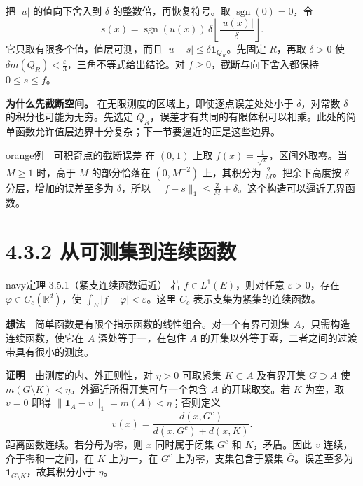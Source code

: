 \documentclass[11pt,a4paper]{article}
\begin{document}
把 \(|u|\) 的值向下舍入到 \(\delta\) 的整数倍，再恢复符号。取
\(\operatorname{sgn}(0)=0\)，令 \begin{equation*}
s(x)=\operatorname{sgn}(u(x))\,\delta
\left\lfloor\frac{|u(x)|}{\delta}\right\rfloor .
\end{equation*} 它只取有限多个值，值层可测，而且
\(|u-s|\le\delta\mathbf1_{Q_R}\)。先固定 \(R\)，再取 \(\delta>0\) 使
\(\delta m(Q_R)<\frac{\varepsilon}{3}\)，三角不等式给出结论。对
\(f\ge0\)，截断与向下舍入都保持 \(0\le s\le f\)。

\textbf{为什么先截断空间。} 在无限测度的区域上，即使逐点误差处处小于
\(\delta\)，对常数 \(\delta\) 的积分也可能为无穷。先选定
\(Q_R\)，误差才有共同的有限体积可以相乘。此处的简单函数允许值层边界十分复杂；下一节要逼近的正是这些边界。

\begin{sboxenv}{orange}{例　可积奇点的截断误差}
在 \((0,1)\) 上取 \(f(x)=\frac{1}{\sqrt{x}}\)，区间外取零。当 \(M\ge1\)
时，高于 \(M\) 的部分恰落在 \((0,M^{-2})\) 上，其积分为
\(\frac{2}{M}\)。把余下高度按 \(\delta\) 分层，增加的误差至多为
\(\delta\)，所以
\(\|f-s\|_1\le \frac{2}{M}+\delta\)。这个构造可以逼近无界函数。

\end{sboxenv}

\section[\S{}4.3.2
从可测集到连续函数]{4.3.2
从可测集到连续函数}\label{ux4eceux53efux6d4bux96c6ux5230ux8fdeux7eedux51fdux6570}

\begin{sboxenv}{navy}{定理 3.5.1（紧支连续函数逼近）}
若 \(f\in L^1(E)\)，则对任意 \(\varepsilon>0\)，存在
\(\varphi\in C_c(\mathbb R^d)\)，使
\(\int_E|f-\varphi|<\varepsilon\)。这里 \(C_c\)
表示支集为紧集的连续函数。

\end{sboxenv}

\textbf{想法}　简单函数是有限个指示函数的线性组合。对一个有界可测集
\(A\)，只需构造连续函数，使它在 \(A\) 深处等于一，在包住 \(A\)
的开集以外等于零，二者之间的过渡带具有很小的测度。

\textbf{证明}　由测度的内、外正则性，对 \(\eta>0\) 可取紧集
\(K\subset A\) 及有界开集 \(G\supset A\) 使
\(m(G\setminus K)<\eta\)。外逼近所得开集可与一个包含 \(A\)
的开球取交。若 \(K\) 为空，取 \(v=0\) 即得
\(\|\mathbf1_A-v\|_1=m(A)<\eta\)；否则定义 \begin{equation*}
v(x)=\frac{d(x,G^c)}{d(x,G^c)+d(x,K)} .
\tag{4.3.1}
\end{equation*} 距离函数连续。若分母为零，则 \(x\) 同时属于闭集 \(G^c\) 和
\(K\)，矛盾。因此 \(v\) 连续，介于零和一之间，在 \(K\) 上为一，在
\(G^c\) 上为零，支集包含于紧集 \(\overline G\)。误差至多为
\(\mathbf1_{G\setminus K}\)，故其积分小于 \(\eta\)。
\end{document}
